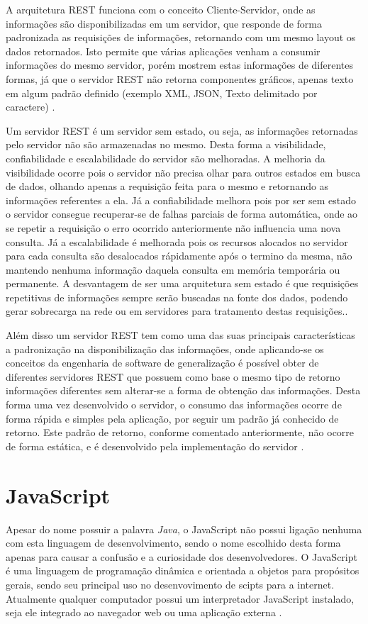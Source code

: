 A arquitetura REST funciona com o conceito Cliente-Servidor, onde as informações são disponibilizadas em um servidor, que responde de forma padronizada as requisições de informações, retornando com um mesmo layout os dados retornados. Isto permite que várias aplicações venham a consumir informações do mesmo servidor, porém mostrem estas informações de diferentes formas, já que o servidor REST não retorna componentes gráficos, apenas texto em algum padrão definido (exemplo XML, JSON, Texto delimitado por caractere) \cite{RESTFielding}.

Um servidor REST é um servidor sem estado, ou seja, as informações retornadas pelo servidor não são armazenadas no mesmo. Desta forma a visibilidade, confiabilidade e escalabilidade do servidor são melhoradas. A melhoria da visibilidade ocorre pois o servidor não precisa olhar para outros estados em busca de dados, olhando apenas a requisição feita para o mesmo e retornando as informações referentes a ela. Já a confiabilidade melhora pois por ser sem estado o servidor consegue recuperar-se de falhas parciais de forma automática, onde ao se repetir a requisição o erro ocorrido anteriormente não influencia uma nova consulta. Já a escalabilidade é melhorada pois os recursos alocados no servidor para cada consulta são desalocados rápidamente após o termino da mesma, não mantendo nenhuma informação daquela consulta em memória temporária ou permanente. A desvantagem de ser uma arquitetura sem estado é que requisições repetitivas de informações sempre serão buscadas na fonte dos dados, podendo gerar sobrecarga na rede ou em servidores para tratamento destas requisições.\cite{RESTFielding}.

Além disso um servidor REST tem como uma das suas principais características a padronização na disponibilização das informações, onde aplicando-se os conceitos da engenharia de software de generalização é possível obter de diferentes servidores REST que possuem como base o mesmo tipo de retorno informações diferentes sem alterar-se a forma de obtenção das informações. Desta forma uma vez desenvolvido o servidor, o consumo das informações ocorre de forma rápida e simples pela aplicação, por seguir um padrão já conhecido de retorno. Este padrão de retorno, conforme comentado anteriormente, não ocorre de forma estática, e é desenvolvido pela implementação do servidor \cite{RESTFielding}.

\section{JavaScript}
Apesar do nome possuir a palavra \emph{Java}, o JavaScript não possui ligação nenhuma com esta linguagem de desenvolvimento, sendo o nome escolhido desta forma apenas para causar a confusão e a curiosidade dos desenvolvedores. O JavaScript é uma linguagem de programação dinâmica e orientada a objetos para propósitos gerais, sendo seu principal uso no desenvovimento de scipts para a internet. Atualmente qualquer computador possui um interpretador JavaScript instalado, seja ele integrado ao navegador web ou uma aplicação externa \cite{JavaScriptCrockford}.

